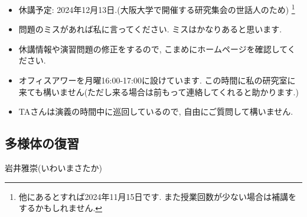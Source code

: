 \documentclass[dvipdfmx,a4paper,11pt]{article}
\theoremstyle{definition}
\begin{document}
\vspace{11pt}
\begin{itemize}
  \setlength{\parskip}{0cm} %
  \setlength{\itemsep}{0cm} %
  \item 休講予定: 2024年12月13日.(大阪大学で開催する研究集会の世話人のため)  \footnote{他にあるとすれば2024年11月15日です. また授業回数が少ない場合は補講をするかもしれません.} 
    \item 問題のミスがあれば私に言ってください. ミスはかなりあると思います. 
  \item 休講情報や演習問題の修正をするので, こまめにホームページを確認してください.
    \item オフィスアワーを月曜16:00-17:00に設けています. この時間に私の研究室に来ても構いません(ただし来る場合は前もって連絡してくれると助かります.)
    \item TAさんは演義の時間中に巡回しているので, 自由にご質問して構いません. 
 \end{itemize}
 
\newpage






\begin{center}
\section{多様体の復習}
\label{sec-manifold}
\end{center}
\begin{flushright}
 岩井雅崇(いわいまさたか)
\end{flushright}
\end{document}
